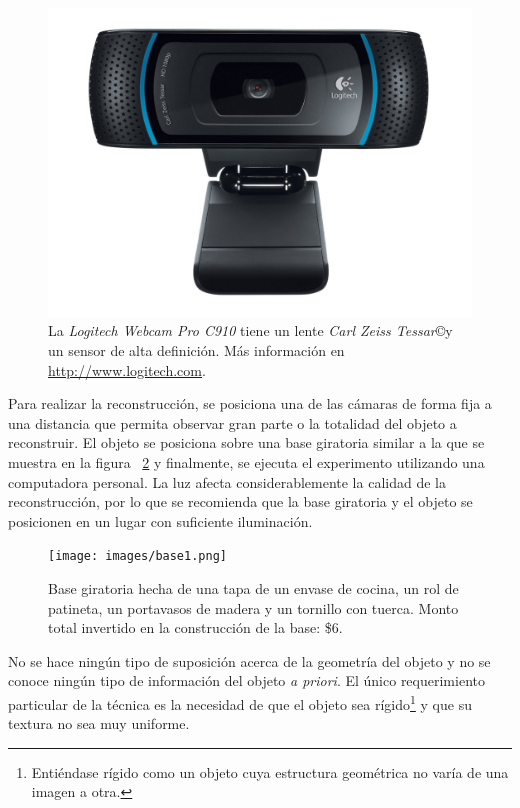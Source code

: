 \begin{figure}[H]
\centering
\includegraphics[width=1.0\textwidth]{images/camara2.jpg}
\caption[Logitech Webcam Pro C910]%
{La \textit{Logitech Webcam Pro C910} tiene un lente \textit{Carl Zeiss Tessar}\copyright y un sensor de alta definici\'{o}n. Más información en \url{http://www.logitech.com}.}
\label{fig:Camera2}
\end{figure}


Para realizar la reconstrucci\'{o}n, se posiciona una de las c\'{a}maras de forma fija a una distancia que permita observar gran parte o la totalidad del objeto a reconstruir. El objeto se posiciona sobre una base giratoria similar a la que se muestra en la figura ~\ref{fig:Base} y finalmente, se ejecuta el experimento utilizando una computadora personal. La luz afecta considerablemente la calidad de la reconstrucci\'{o}n, por lo que se recomienda que la base giratoria y el objeto se posicionen en un lugar con suficiente iluminaci\'{o}n.


\begin{figure}[H]
\centering
\texttt{[image: images/base1.png]}
\caption[Base giratoria]%
{Base giratoria hecha de una tapa de un envase de cocina, un rol de patineta, un portavasos de madera y un tornillo con tuerca. Monto total invertido en la construcci\'{o}n de la base: \$6.}
\label{fig:Base}
\end{figure}


No se hace ning\'{u}n tipo de suposici\'{o}n acerca de la geometr\'{i}a del objeto y no se conoce ning\'{u}n tipo de informaci\'{o}n del objeto \textit{a priori}. El \'{u}nico requerimiento particular de la t\'{e}cnica es la necesidad de que el objeto sea r\'{i}gido\footnote{Enti\'{e}ndase r\'{i}gido como un objeto cuya estructura geom\'{e}trica no var\'{i}a de una imagen a otra.} y que su textura no sea muy uniforme.



